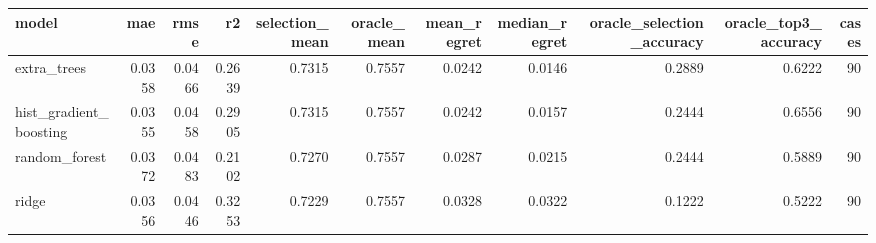 \begin{tabular}{lrrrrrrrrrr}
\toprule
model & mae & rmse & r2 & selection_mean & oracle_mean & mean_regret & median_regret & oracle_selection_accuracy & oracle_top3_accuracy & cases \\
\midrule
extra_trees & 0.0358 & 0.0466 & 0.2639 & 0.7315 & 0.7557 & 0.0242 & 0.0146 & 0.2889 & 0.6222 & 90 \\
hist_gradient_boosting & 0.0355 & 0.0458 & 0.2905 & 0.7315 & 0.7557 & 0.0242 & 0.0157 & 0.2444 & 0.6556 & 90 \\
random_forest & 0.0372 & 0.0483 & 0.2102 & 0.7270 & 0.7557 & 0.0287 & 0.0215 & 0.2444 & 0.5889 & 90 \\
ridge & 0.0356 & 0.0446 & 0.3253 & 0.7229 & 0.7557 & 0.0328 & 0.0322 & 0.1222 & 0.5222 & 90 \\
\bottomrule
\end{tabular}
